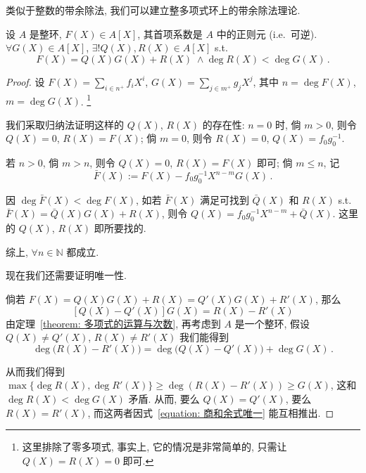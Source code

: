 \documentclass[openany, a5paper, oneside]{ctexbook}
\begin{document}
类似于整数的带余除法, 我们可以建立整多项式环上的带余除法理论.

\begin{theorem}[多项式的带余除法]\label{theorem: 多项式的带余除法}
	设 $A$ 是整环, $F(X) \in A[X]$, 其首项系数是 $A$ 中的正则元 (i.e.\ 可逆). 
	$\forall G(X) \in A[X]$, $\exists! Q(X), R(X) \in A[X]$ s.t.\ 
	\begin{equation*}
		F(X) = Q(X) G(X) + R(X)\; \wedge \deg R(X) < \deg G(X)\,.
	\end{equation*}
\end{theorem}
\begin{proof}
	设 $F(X) = \sum_{i \in n^+} f_i X^i$, $G(X) = \sum_{j \in m^+} g_j X^j$, 其中 $n = \deg F(X)$, $m = \deg G(X)$. \footnote{这里排除了零多项式, 事实上, 它的情况是非常简单的, 只需让 $Q(X) = R(X) = 0$ 即可.} 

	我们采取归纳法证明这样的 $Q(X)$, $R(X)$ 的存在性:
	$n = 0$ 时, 倘 $m > 0$, 则令 $Q(X) = 0$, $R(X) = F(X)$; 
	倘 $m = 0$, 则令 $R(X) = 0$, $Q(X) = f_0 g_0^{-1}$.

	若 $n > 0$, 倘 $m > n$, 则令 $Q(X) = 0$, $R(X) = F(X)$ 即可;
	倘 $m \leq n$, 记
	\begin{equation*}
		\bar F(X) := F(X) - f_0 g_0^{-1} X^{n - m} G(X)\,.
	\end{equation*}

	因 $\deg \bar F(X) < \deg F(X)$, 如若 $\bar F(X)$ 满足可找到 $\bar Q(X)$ 和 $R(X)$ s.t.\ $\bar F(X) = \bar Q(X) G(X) + R(X)$, 则令 $Q(X) = f_0 g_0^{-1} X^{n - m} + \bar Q(X)$. 
	这里的 $Q(X)$, $R(X)$ 即所要找的.

	综上, $\forall n \in \mathbb N$ 都成立.

	现在我们还需要证明唯一性.

	倘若 $F(X) = Q(X) G(X) + R(X) = Q'(X) G(X) + R'(X)$, 那么
	\begin{equation}\label{equation: 商和余式唯一}
		[Q(X) - Q'(X)] G(X) = R(X) - R'(X)
	\end{equation}
	由定理~\ref{theorem: 多项式的运算与次数}, 再考虑到 $A$ 是一个整环, 假设 $Q(X) \neq Q'(X)$, $R(X) \neq R'(X)$ 我们能得到
	\begin{equation*}
		\deg \big(R(X) - R'(X)\big) = \deg \big( Q(X) - Q'(X)\big) + \deg G(X)\,.
	\end{equation*}

	从而我们得到 $\max\{\deg R(X), \deg R'(X) \} \geq \deg(R(X) - R'(X)) \geq G(X)$, 这和 $\deg R(X) < \deg G(X)$ 矛盾. 从而, 要么 $Q(X) = Q'(X)$, 要么 $R(X) = R'(X)$, 而这两者因式~\ref{equation: 商和余式唯一} 能互相推出.
\end{proof}
\end{document}

